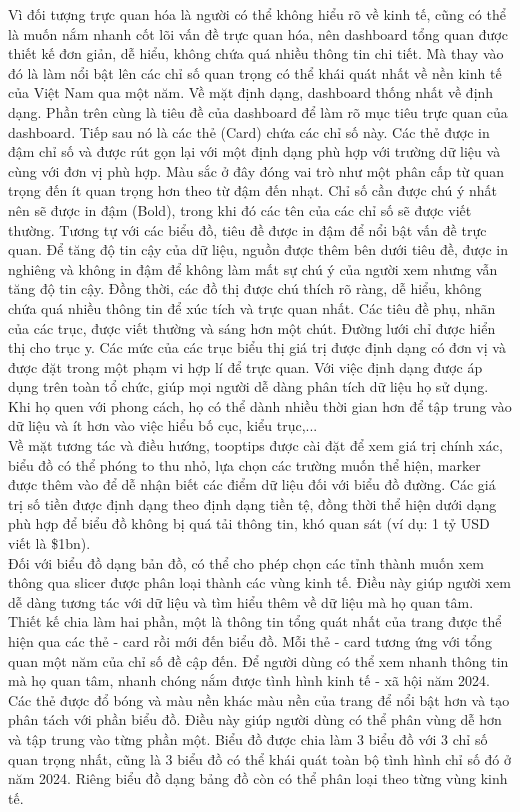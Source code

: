 \documentclass[a4paper]{report}
\begin{document}
{{Vì đối tượng trực quan hóa là người có thể không hiểu rõ về kinh tế, cũng có thể là muốn nắm nhanh cốt lõi vấn đề trực quan hóa, nên dashboard tổng quan được thiết kế đơn giản, dễ hiểu, không chứa quá nhiều thông tin chi tiết. Mà thay vào đó là làm nổi bật lên các chỉ số quan trọng có thể khái quát nhất về nền kinh tế của Việt Nam qua một năm. 
Về mặt định dạng, dashboard thống nhất về định dạng. Phần trên cùng là tiêu đề của dashboard để làm rõ mục tiêu trực quan của dashboard. Tiếp sau nó là các thẻ (Card) chứa các chỉ số này. Các thẻ được in đậm chỉ số và được rút gọn lại với một định dạng phù hợp với trường dữ liệu và cùng với đơn vị phù hợp. Màu sắc ở đây đóng vai trò như một phân cấp từ quan trọng đến ít quan trọng hơn theo từ đậm đến nhạt. Chỉ số cần được chú ý nhất nên sẽ được in đậm (Bold), trong khi đó các tên của các chỉ số sẽ được viết thường.
Tương tự với các biểu đồ, tiêu đề được in đậm để nổi bật vấn đề trực quan. Để tăng độ tin cậy của dữ liệu, nguồn được thêm bên dưới tiêu đề, được in nghiêng và không in đậm để không làm mất sự chú ý của người xem nhưng vẫn tăng độ tin cậy. Đồng thời, các đồ thị được chú thích rõ ràng, dễ hiểu, không chứa quá nhiều thông tin để xúc tích và trực quan nhất. Các tiêu đề phụ, nhãn của các trục, được viết thường và sáng hơn một chút.
Đường lưới chỉ được hiển thị cho trục y. Các mức của các trục biểu thị giá trị được định dạng có đơn vị và được đặt trong một phạm vi hợp lí để trực quan.
Với việc định dạng được áp dụng trên toàn tổ chức, giúp mọi người dễ dàng phân tích dữ liệu họ sử dụng. Khi họ quen với phong cách, họ có thể dành nhiều thời gian hơn để tập trung vào dữ liệu và ít hơn vào việc hiểu bố cục, kiểu trục,...\\

Về mặt tương tác và điều hướng, tooptips được cài đặt để xem giá trị chính xác, biểu đồ có thể phóng to thu nhỏ, lựa chọn các trường muốn thể hiện, marker được thêm vào để dễ nhận biết các điểm dữ liệu đối với biểu đồ đường. 
Các giá trị số tiền được định dạng theo định dạng tiền tệ, đồng thời thể hiện dưới dạng phù hợp để biểu đồ không bị quá tải thông tin, khó quan sát (ví dụ: 1 tỷ USD viết là \$1bn).\\
Đối với biểu đồ dạng bản đồ, có thể cho phép chọn các tỉnh thành muốn xem thông qua slicer được phân loại thành các vùng kinh tế. Điều này giúp người xem dễ dàng tương tác với dữ liệu và tìm hiểu thêm về dữ liệu mà họ quan tâm.\\

Thiết kế chia làm hai phần, một là thông tin tổng quát nhất của trang được thể hiện qua các thẻ - card rồi mới đến biểu đồ. Mỗi thẻ - card tương ứng với tổng quan một năm của chỉ số đề cập đến.
Để người dùng có thể xem nhanh thông tin mà họ quan tâm, nhanh chóng nắm được tình hình kinh tế - xã hội năm 2024. Các thẻ được đổ bóng và màu nền khác màu nền của trang để nổi bật hơn và tạo phân tách với phần biểu đồ. Điều này giúp người dùng có thể phân vùng dễ hơn và tập trung vào từng phần một.
Biểu đồ được chia làm 3 biểu đồ với 3 chỉ số quan trọng nhất, cũng là 3 biểu đồ có thể khái quát toàn bộ tình hình chỉ số đó ở năm 2024. Riêng biểu đồ dạng bảng đồ còn có thể phân loại theo từng vùng kinh tế.\\


}}
\end{document}
